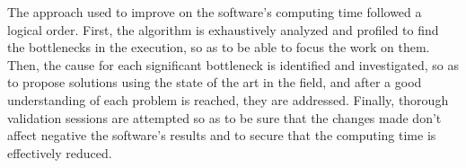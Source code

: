  \label{sec:prop}

The approach used to improve on the software's computing time followed a logical order.
First, the algorithm is exhaustively analyzed and profiled to find the bottlenecks in the execution, so as to be able to focus the work on them.
Then, the cause for each significant bottleneck is identified and investigated, so as to propose solutions using the state of the art in the field, and after a good understanding of each problem is reached, they are addressed.
Finally, thorough validation sessions are attempted so as to be sure that the changes made don't affect negative the software's results and to secure that the computing time is effectively reduced.

\newpage

\newpage


% 
\newpage
